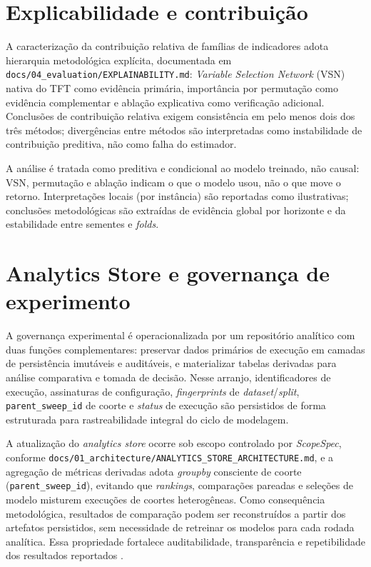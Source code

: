 \section{Explicabilidade e contribuição}
A caracterização da contribuição relativa de famílias de indicadores adota hierarquia metodológica explícita, documentada em \texttt{docs/04\_evaluation/EXPLAINABILITY.md}: \textit{Variable Selection Network} (VSN) nativa do TFT \cite{LIMETAL2021TFT} como evidência primária, importância por permutação como evidência complementar e ablação explicativa como verificação adicional. Conclusões de contribuição relativa exigem consistência em pelo menos dois dos três métodos; divergências entre métodos são interpretadas como instabilidade de contribuição preditiva, não como falha do estimador.

A análise é tratada como preditiva e condicional ao modelo treinado, não causal: VSN, permutação e ablação indicam o que o modelo usou, não o que move o retorno. Interpretações locais (por instância) são reportadas como ilustrativas; conclusões metodológicas são extraídas de evidência global por horizonte e da estabilidade entre sementes e \textit{folds}.

\section{Analytics Store e governança de experimento}
A governança experimental é operacionalizada por um repositório analítico com duas funções complementares: preservar dados primários de execução em camadas de persistência imutáveis e auditáveis, e materializar tabelas derivadas para análise comparativa e tomada de decisão. Nesse arranjo, identificadores de execução, assinaturas de configuração, \textit{fingerprints} de \textit{dataset}/\textit{split}, \texttt{parent\_sweep\_id} de coorte e \textit{status} de execução são persistidos de forma estruturada para rastreabilidade integral do ciclo de modelagem.

A atualização do \textit{analytics store} ocorre sob escopo controlado por \textit{ScopeSpec}, conforme \texttt{docs/01\_architecture/ANALYTICS\_STORE\_ARCHITECTURE.md}, e a agregação de métricas derivadas adota \textit{groupby} consciente de coorte (\texttt{parent\_sweep\_id}), evitando que \textit{rankings}, comparações pareadas e seleções de modelo misturem execuções de coortes heterogêneas. Como consequência metodológica, resultados de comparação podem ser reconstruídos a partir dos artefatos persistidos, sem necessidade de retreinar os modelos para cada rodada analítica. Essa propriedade fortalece auditabilidade, transparência e repetibilidade dos resultados reportados \cite{PINEAU2021REPRODUCIBILITY}.

